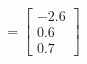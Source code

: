 \documentclass[preview]{standalone}
\begin{document}
\begin{align*}
=\begin{bmatrix} -2.6 \\ 0.6 \\ 0.7 \end{bmatrix}
\end{align*}
\end{document}
